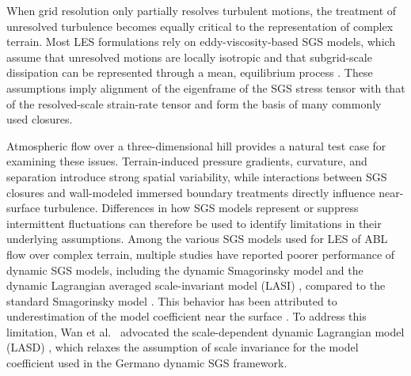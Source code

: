 \documentclass[%
superscriptaddress,
 amsmath,amssymb,
pra,
showkeys,
]{revtex4-2}
\begin{document}
When grid resolution only partially resolves turbulent motions, the treatment of unresolved turbulence becomes equally critical to the representation of complex terrain. Most LES formulations rely on eddy-viscosity-based SGS models, which assume that unresolved motions are locally isotropic and that subgrid-scale dissipation can be represented through a mean, equilibrium process \cite{smagorinsky1963general,sagaut2006large}. These assumptions imply alignment of the eigenframe of the SGS stress tensor with that of the resolved-scale strain-rate tensor and form the basis of many commonly used closures. 

Atmospheric flow over a three-dimensional hill provides a natural test case for examining these issues. Terrain-induced pressure gradients, curvature, and separation introduce strong spatial variability, while interactions between SGS closures and wall-modeled immersed boundary treatments directly influence near-surface turbulence. Differences in how SGS models represent or suppress intermittent fluctuations can therefore be used to identify limitations in their underlying assumptions. Among the various SGS models used for LES of ABL flow over complex terrain, multiple studies have reported poorer performance of dynamic SGS models, including the dynamic Smagorinsky model \cite{ghosal1995dynamic} and the dynamic Lagrangian averaged scale-invariant model (LASI) \cite{meneveau2000scale}, compared to the standard Smagorinsky model \cite{smagorinsky1963general}. This behavior has been attributed to underestimation of the model coefficient near the surface \cite{wan2007evaluation,iizuka2004performance,yang2020study}. To address this limitation, Wan et al.~\cite{wan2007evaluation} advocated the scale-dependent dynamic Lagrangian model (LASD) \cite{bou2005scale}, which relaxes the assumption of scale invariance for the model coefficient used in the Germano dynamic SGS framework.

\end{document}
